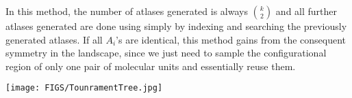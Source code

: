 \documentclass[]{article}
\newcommand{\rmc}{rigid molecular component}
\begin{document}
In this method, the number of atlases generated is always $\binom{k}{2}$ and all
further atlases generated are done using simply by indexing and searching the
previously generated atlases. 
If all $A_i$'s are identical, this method gains from the consequent
symmetry in the landscape, since we just need to sample the
configurational region of only one pair of molecular units and essentially
reuse them. 

\begin{figure*}[htpb]
		\texttt{[image: FIGS/TounramentTree.jpg]}
		\caption{Tournament tree showing the assembly of 16 \rmc s, $A_1$ through
		$A_{16}$. The input are the leaves of the tree, the internal nodes adjacent
		to the leaves are atlases generated using the core algorithm. All
		other internal nodes are obtained through a direct sum of its children.
		The root node is the final atlas of all the input \rmc s. 
		See text in Section \ref{sec:AlgorithmVariantkg2}.}
		\label{fig:tournamentTree}
\end{figure*}
\end{document}
